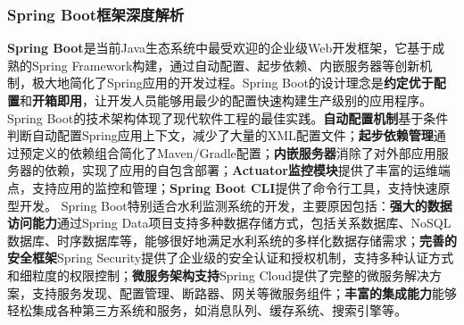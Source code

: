 \subsubsection{Spring Boot框架深度解析}\label{spring-bootux6846ux67b6ux6df1ux5ea6ux89e3ux6790} \textbf{Spring
Boot}是当前Java生态系统中最受欢迎的企业级Web开发框架，它基于成熟的Spring Framework构建，通过自动配置、起步依赖、内嵌服务器等创新机制，极大地简化了Spring应用的开发过程。Spring
Boot的设计理念是\textbf{约定优于配置}和\textbf{开箱即用}，让开发人员能够用最少的配置快速构建生产级别的应用程序。 Spring
Boot的技术架构体现了现代软件工程的最佳实践。\textbf{自动配置机制}基于条件判断自动配置Spring应用上下文，减少了大量的XML配置文件；\textbf{起步依赖管理}通过预定义的依赖组合简化了Maven/Gradle配置；\textbf{内嵌服务器}消除了对外部应用服务器的依赖，实现了应用的自包含部署；\textbf{Actuator监控模块}提供了丰富的运维端点，支持应用的监控和管理；\textbf{Spring
Boot CLI}提供了命令行工具，支持快速原型开发。 Spring Boot特别适合水利监测系统的开发，主要原因包括：\textbf{强大的数据访问能力}通过Spring
Data项目支持多种数据存储方式，包括关系数据库、NoSQL数据库、时序数据库等，能够很好地满足水利系统的多样化数据存储需求；\textbf{完善的安全框架}Spring
Security提供了企业级的安全认证和授权机制，支持多种认证方式和细粒度的权限控制；\textbf{微服务架构支持}Spring
Cloud提供了完整的微服务解决方案，支持服务发现、配置管理、断路器、网关等微服务组件；\textbf{丰富的集成能力}能够轻松集成各种第三方系统和服务，如消息队列、缓存系统、搜索引擎等。
